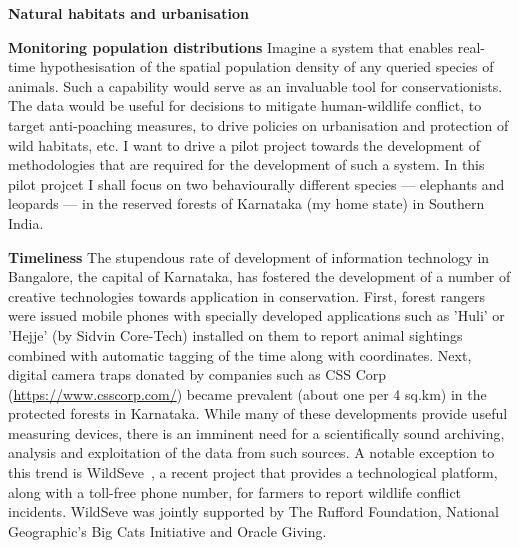 \documentclass[a4paper,10pt,twocolumn]{article}
\newcommand{\hdg}[1] {\noindent \textbf{#1} }
\begin{document}
{ 
\Large 
{}%
}


\hdg{Natural habitats and urbanisation}

\hdg{Monitoring population distributions}
Imagine a system that enables real-time hypothesisation of the spatial population density of any queried species of animals. Such a capability would serve as an invaluable tool for conservationists. The data would be useful for decisions to mitigate human-wildlife conflict, to target anti-poaching measures, to drive policies on urbanisation and protection of wild habitats, etc. I want to drive a pilot project towards the development of methodologies that are required for the development of such a system. In this pilot projcet I shall focus on two behaviourally different species --- elephants and leopards --- in the reserved forests of Karnataka (my home state) in Southern India. 


\hdg{Timeliness}
The stupendous rate of development of information technology in Bangalore, the capital of Karnataka, has fostered the development of a number of creative technologies towards application in conservation. First, forest rangers were issued mobile phones with specially developed applications such as 'Huli' or 'Hejje' (by Sidvin Core-Tech) installed on them to report animal sightings combined with automatic tagging of the time along with coordinates. Next, digital camera traps donated by companies such as CSS Corp (\url{https://www.csscorp.com/}) became prevalent (about one per 4 sq.km) in the protected forests in Karnataka. While many of these developments provide useful measuring devices, there is an imminent need for a scientifically sound archiving, analysis and exploitation of the data from such sources. A notable exception to this trend is WildSeve~\cite{}, a recent project that provides a technological platform, along with a toll-free phone number, for farmers to report wildlife conflict incidents. WildSeve was jointly supported by The Rufford Foundation, National Geographic's Big Cats Initiative and Oracle Giving.
\end{document}
